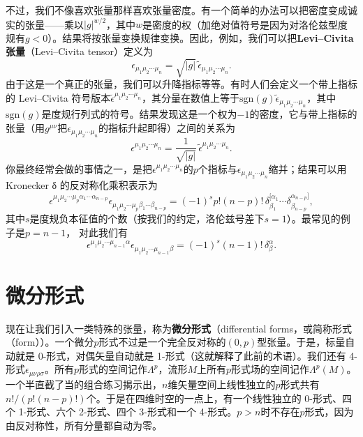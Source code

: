 不过，我们不像喜欢张量那样喜欢张量密度。有一个简单的办法可以把密度变成诚实的张量——乘以$|g|^{w/2}$，其中$w$是密度的权（加绝对值符号是因为对洛伦兹型度规有$g<0$）。结果将按张量变换规律变换。因此，例如，我们可以把\textbf{Levi–Civita 张量}（Levi–Civita tensor）定义为
\begin{equation*}
\boxed{\ \epsilon_{\mu_1\mu_2\cdots\mu_n}=\sqrt{|g|}\,\tilde\epsilon_{\mu_1\mu_2\cdots\mu_n}.\ }
\tag{2.69}
\end{equation*}
由于这是一个真正的张量，我们可以升降指标等等。有时人们会定义一个带上指标的 Levi–Civita 符号版本$\tilde\epsilon^{\mu_1\mu_2\cdots\mu_n}$，其分量在数值上等于$\mathrm{sgn}(g)\tilde\epsilon_{\mu_1\mu_2\cdots\mu_n}$，其中$\mathrm{sgn}(g)$是度规行列式的符号。结果发现这是一个权为$-1$的密度，它与带上指标的张量（用$g^{\mu\nu}$把$\epsilon_{\mu_1\mu_2\cdots\mu_n}$的指标升起即得）之间的关系为
\begin{equation*}
\epsilon^{\mu_1\mu_2\cdots\mu_n}=\frac{1}{\sqrt{|g|}}\,\tilde\epsilon^{\mu_1\mu_2\cdots\mu_n}.
\tag{2.70}
\end{equation*}
你最终经常会做的事情之一，是把$\epsilon^{\mu_1\mu_2\cdots\mu_n}$的$p$个指标与$\epsilon_{\mu_1\mu_2\cdots\mu_n}$缩并；结果可以用 Kronecker δ 的反对称化乘积表示为
\begin{equation*}
\epsilon^{\mu_1\mu_2\cdots\mu_p\alpha_1\cdots\alpha_{n-p}}\epsilon_{\mu_1\mu_2\cdots\mu_p\beta_1\cdots\beta_{n-p}}=(-1)^s p!(n-p)!\,\delta^{[\alpha_1}_{\beta_1}\cdots\delta^{\alpha_{n-p}]}_{\beta_{n-p}},
\tag{2.71}
\end{equation*}
其中$s$是度规负本征值的个数（按我们的约定，洛伦兹号差下$s=1$）。最常见的例子是$p=n-1$，
对此我们有
\begin{equation*}
\epsilon^{\mu_1\mu_2\cdots\mu_{n-1}\alpha}\epsilon_{\mu_1\mu_2\cdots\mu_{n-1}\beta}=(-1)^s (n-1)!\,\delta^\alpha_\beta.
\tag{2.72}
\end{equation*}

\section{微分形式}

现在让我们引入一类特殊的张量，称为\textbf{微分形式}（differential forms，或简称形式（form））。一个微分$p$形式不过是一个完全反对称的$(0,p)$型张量。于是，标量自动就是 0-形式，对偶矢量自动就是 1-形式（这就解释了此前的术语）。我们还有 4-形式$\epsilon_{\mu\nu\rho\sigma}$。所有$p$形式的空间记作$\Lambda^p$，流形$M$上所有$p$形式场的空间记作$\Lambda^p(M)$。一个半直截了当的组合练习揭示出，$n$维矢量空间上线性独立的$p$形式共有$n!/(p!(n-p)!)$个。于是在四维时空的一点上，有一个线性独立的 0-形式、四个 1-形式、六个 2-形式、四个 3-形式和一个 4-形式。$p>n$时不存在$p$形式，因为由反对称性，所有分量都自动为零。

